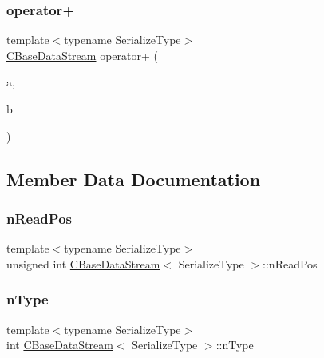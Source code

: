 \subsubsection{\texorpdfstring{operator+}{operator+}}
{\footnotesize\ttfamily template$<$typename Serialize\+Type$>$ \\
\mbox{\hyperlink{class_c_base_data_stream}{C\+Base\+Data\+Stream}} operator+ (\begin{DoxyParamCaption}\item[{const \mbox{\hyperlink{class_c_base_data_stream}{C\+Base\+Data\+Stream}}$<$ Serialize\+Type $>$ \&}]{a,  }\item[{const \mbox{\hyperlink{class_c_base_data_stream}{C\+Base\+Data\+Stream}}$<$ Serialize\+Type $>$ \&}]{b }\end{DoxyParamCaption})\hspace{0.3cm}{\ttfamily [friend]}}



\subsection{Member Data Documentation}
\mbox{\label{class_c_base_data_stream_abcabb286ff13fbe8819e7713d06f8d58}} 
\subsubsection{\texorpdfstring{n\+Read\+Pos}{nReadPos}}
{\footnotesize\ttfamily template$<$typename Serialize\+Type$>$ \\
unsigned int \mbox{\hyperlink{class_c_base_data_stream}{C\+Base\+Data\+Stream}}$<$ Serialize\+Type $>$\+::n\+Read\+Pos\hspace{0.3cm}{\ttfamily [protected]}}

\mbox{\label{class_c_base_data_stream_acd93d8bc03d65130819f2ff79be43234}} 
\subsubsection{\texorpdfstring{n\+Type}{nType}}
{\footnotesize\ttfamily template$<$typename Serialize\+Type$>$ \\
int \mbox{\hyperlink{class_c_base_data_stream}{C\+Base\+Data\+Stream}}$<$ Serialize\+Type $>$\+::n\+Type}

